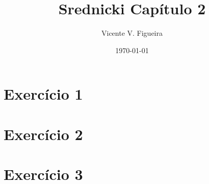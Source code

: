 \documentclass[twoside]{amsart}
\title{
Srednicki Capítulo 2
}
\author{
  Vicente V. Figueira
       }
\date{\today}
\numberwithin{equation}{section}
\begin{document}
\maketitle

\tableofcontents


\section{Exercício 1}




\section{Exercício 2}




\section{Exercício 3}
\end{document}
